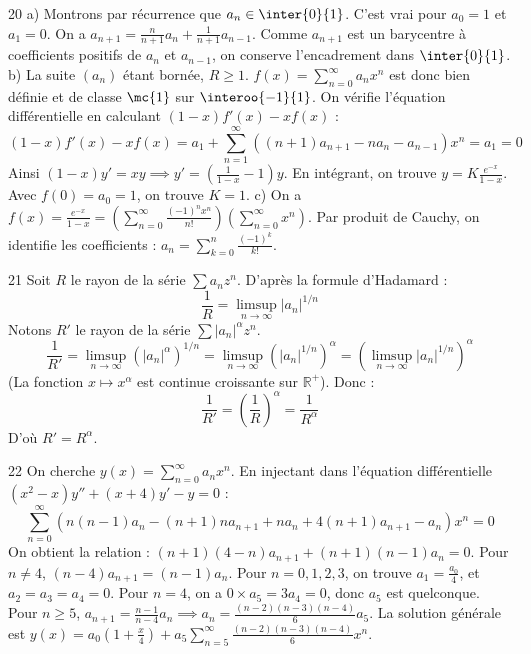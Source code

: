 \begin{correction}{20}
a) Montrons par récurrence que $a_n \in \inter{0}{1}$. C'est vrai pour $a_0=1$ et $a_1=0$. 
On a $a_{n+1} = \frac{n}{n+1}a_n + \frac{1}{n+1}a_{n-1}$. Comme $a_{n+1}$ est un barycentre à coefficients positifs de $a_n$ et $a_{n-1}$, on conserve l'encadrement dans $\inter{0}{1}$. 
b) La suite $(a_n)$ étant bornée, $R \ge 1$. $f(x) = \sum_{n=0}^\infty a_n x^n$ est donc bien définie et de classe $\mc{1}$ sur $\interoo{-1}{1}$. 
On vérifie l'équation différentielle en calculant $(1-x)f'(x) - xf(x)$ : 
$$ (1-x)f'(x) - xf(x) = a_1 + \sum_{n=1}^\infty \left( (n+1)a_{n+1} - na_n - a_{n-1} \right) x^n = a_1 = 0 $$ 
Ainsi $(1-x)y' = xy \implies y' = \left(\frac{1}{1-x} - 1\right)y$. 
En intégrant, on trouve $y = K \frac{e^{-x}}{1-x}$. Avec $f(0)=a_0=1$, on trouve $K=1$. 
c) On a $f(x) = \frac{e^{-x}}{1-x} = \left(\sum_{n=0}^\infty \frac{(-1)^n x^n}{n!}\right) \left(\sum_{n=0}^\infty x^n\right)$. 
Par produit de Cauchy, on identifie les coefficients : $a_n = \sum_{k=0}^n \frac{(-1)^k}{k!}$. 
\end{correction}

\begin{correction}{21}
Soit $R$ le rayon de la série $\sum a_n z^n$. 
D'après la formule d'Hadamard :
$$ \frac{1}{R} = \limsup_{n \to \infty} |a_n|^{1/n} $$ 
Notons $R'$ le rayon de la série $\sum |a_n|^\alpha z^n$. 
$$ \frac{1}{R'} = \limsup_{n \to \infty} (|a_n|^\alpha)^{1/n} = \limsup_{n \to \infty} (|a_n|^{1/n})^\alpha = \left( \limsup_{n \to \infty} |a_n|^{1/n} \right)^\alpha $$ 
(La fonction $x \mapsto x^\alpha$ est continue croissante sur $\mathbb{R}^+$). 
Donc :
$$ \frac{1}{R'} = \left(\frac{1}{R}\right)^\alpha = \frac{1}{R^\alpha} $$ 
D'où $R' = R^\alpha$. 
\end{correction}

\begin{correction}{22}
On cherche $y(x) = \sum_{n=0}^\infty a_n x^n$. 
En injectant dans l'équation différentielle $(x^2-x)y''+(x+4)y'-y=0$ : 
$$ \sum_{n=0}^\infty \left( n(n-1)a_n - (n+1)na_{n+1} + na_n + 4(n+1)a_{n+1} - a_n \right) x^n = 0 $$ 
On obtient la relation : $(n+1)(4-n)a_{n+1} + (n+1)(n-1)a_n = 0$. 
Pour $n \neq 4$, $(n-4)a_{n+1} = (n-1)a_n$. 
Pour $n=0, 1, 2, 3$, on trouve $a_1 = \frac{a_0}{4}$, et $a_2 = a_3 = a_4 = 0$. 
Pour $n=4$, on a $0 \times a_5 = 3a_4 = 0$, donc $a_5$ est quelconque. 
Pour $n \ge 5$, $a_{n+1} = \frac{n-1}{n-4}a_n \implies a_n = \frac{(n-2)(n-3)(n-4)}{6} a_5$. 
La solution générale est $y(x) = a_0 \left(1 + \frac{x}{4}\right) + a_5 \sum_{n=5}^\infty \frac{(n-2)(n-3)(n-4)}{6} x^n$. 
\end{correction}


